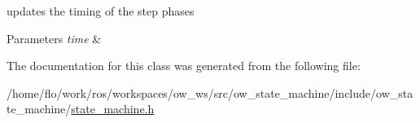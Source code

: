 updates the timing of the step phases 


\begin{DoxyParams}{Parameters}
{\em time} & \\
\hline
\end{DoxyParams}


The documentation for this class was generated from the following file\+:\begin{DoxyCompactItemize}
\item 
/home/flo/work/ros/workspaces/ow\+\_\+ws/src/ow\+\_\+state\+\_\+machine/include/ow\+\_\+state\+\_\+machine/\hyperlink{state__machine_8h}{state\+\_\+machine.\+h}\end{DoxyCompactItemize}
